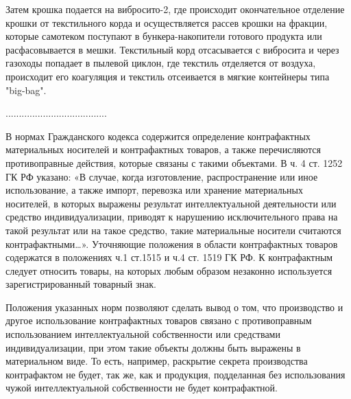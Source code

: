 Затем крошка подается на вибросито-2, где происходит окончательное отделение крошки от текстильного корда и осуществляется рассев крошки на фракции, которые самотеком поступают в бункера-накопители готового продукта или расфасовывается в мешки.
Текстильный корд отсасывается с вибросита и через газоходы попадает в пылевой циклон, где текстиль отделяется от воздуха, происходит его коагуляция и текстиль отсеивается в мягкие контейнеры типа "big-bag".






......................................

В нормах Гражданского кодекса содержится определение контрафактных материальных носителей и контрафактных товаров, а также перечисляются противоправные действия, которые связаны с такими объектами. В ч. 4 ст. 1252 ГК РФ указано: «В случае, когда изготовление, распространение или иное использование, а также импорт, перевозка или хранение материальных носителей, в которых выражены результат интеллектуальной деятельности или средство индивидуализации, приводят к нарушению исключительного права на такой результат или на такое средство, такие материальные носители считаются контрафактными…». Уточняющие положения в области контрафактных товаров содержатся в положениях ч.1 ст.1515 и ч.4 ст. 1519 ГК РФ. К контрафактным следует относить товары, на которых любым образом незаконно используется зарегистрированный товарный знак.

Положения указанных норм позволяют сделать вывод о том, что производство и другое использование контрафактных товаров связано с противоправным использованием интеллектуальной собственности или средствами индивидуализации, при этом такие объекты должны быть выражены в материальном виде. То есть, например, раскрытие секрета производства контрафактом не будет, так же, как и продукция, подделанная без использования чужой интеллектуальной собственности не будет контрафактной.






